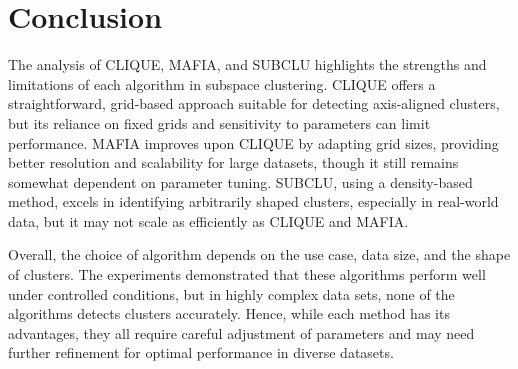 \section{Conclusion}
The analysis of CLIQUE, MAFIA, and SUBCLU highlights the strengths and limitations of each algorithm in subspace clustering. CLIQUE offers a straightforward, grid-based approach suitable for detecting axis-aligned clusters, but its reliance on fixed grids and sensitivity to parameters can limit performance. MAFIA improves upon CLIQUE by adapting grid sizes, providing better resolution and scalability for large datasets, though it still remains somewhat dependent on parameter tuning. SUBCLU, using a density-based method, excels in identifying arbitrarily shaped clusters, especially in real-world data, but it may not scale as efficiently as CLIQUE and MAFIA.

Overall, the choice of algorithm depends on the use case, data size, and the shape of clusters. The experiments demonstrated that these algorithms perform well under controlled conditions, but in highly complex data sets, none of the algorithms detects clusters accurately. Hence, while each method has its advantages, they all require careful adjustment of parameters and may need further refinement for optimal performance in diverse datasets.